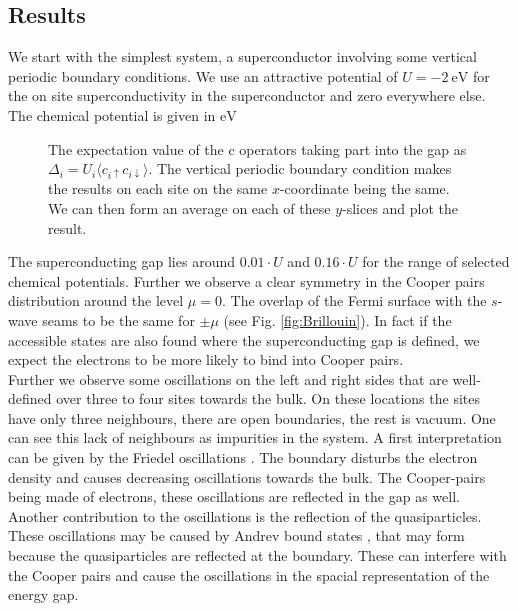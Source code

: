 \documentclass[..\main.tex]{subfile}
\begin{document}
\subsection{Results}
We start with the simplest system, a superconductor involving some vertical periodic boundary conditions.
We use an attractive potential of $U=\SI{-2}{\electronvolt}$ for the on site superconductivity in the superconductor and zero everywhere else.
The chemical potential is given in $\si{\electronvolt}$
\begin{figure}[H]
  \centering
  
  \caption{The expectation value of the c operators taking part into the gap as $\Delta_i = U_i\langle c_{i\uparrow}c_{i\downarrow}\rangle$. The  
  vertical periodic boundary condition makes the results on each site on the same $x$-coordinate being the same.
    We can then form an average on each of these $y$-slices and plot the result.}
\end{figure}
The superconducting gap lies around $0.01\cdot U$ and $0.16\cdot U$ for the range of selected chemical potentials. Further we observe a 
clear symmetry in the Cooper pairs distribution around the level $\mu =0$. The overlap of the Fermi surface with the $s$-wave seams
to be the same for $\pm\mu$ (see Fig. \ref{fig:Brillouin}). In fact if the accessible states are also found where the superconducting gap 
is defined, we expect the electrons to be more likely to bind into Cooper pairs.\\   
Further we observe some oscillations on the left and right sides that are well-defined over three to four sites towards the bulk. On these locations the sites have only three
neighbours, there are open boundaries, the rest is vacuum. One can see this lack of neighbours as impurities in the system. 
A first interpretation can be given by the Friedel oscillations \cite{Harrison1970}. The boundary disturbs the electron density and causes decreasing oscillations towards
the bulk. The Cooper-pairs being made of electrons, these oscillations are reflected in the gap as well. Another contribution to the oscillations
is the reflection of the quasiparticles.
These oscillations may be caused by Andrev bound states \cite{Bobkov_2024}, that may form because the quasiparticles are reflected at the boundary.
These can interfere with the Cooper pairs and cause the oscillations in the spacial representation of the energy gap.\\
\end{document}
